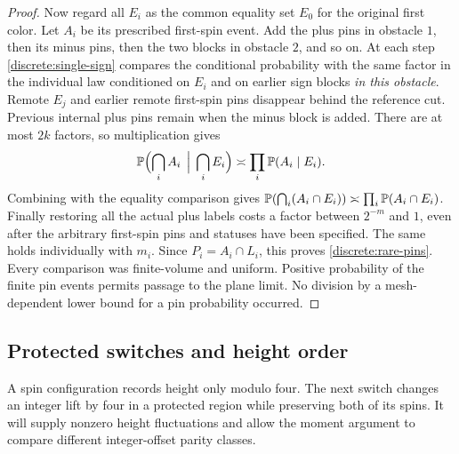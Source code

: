 \begin{proof}
Now regard all $E_i$ as the common equality set $E_0$ for the original
first color. Let $A_i$ be its prescribed first-spin event. Add the plus
pins in obstacle $1$, then its minus pins, then the two blocks in obstacle
$2$, and so on. At each step \eqref{discrete:single-sign} compares the
conditional probability with the same factor in the individual law
conditioned on $E_i$ and on earlier sign blocks \emph{in this obstacle}.
Remote $E_j$ and earlier remote first-spin pins disappear behind the
reference cut. Previous internal plus pins remain when the minus block
is added. There are at most $2k$ factors, so multiplication gives
\[
 \mathbb P\Bigl(\bigcap_i A_i\,\Bigm|\,\bigcap_i E_i\Bigr)
       \asymp\prod_i\mathbb P(A_i\mid E_i).
\]
Combining with the equality comparison gives
$\mathbb P(\bigcap_i(A_i\cap E_i))\asymp
\prod_i\mathbb P(A_i\cap E_i)$. Finally restoring all the actual plus
labels costs a factor between $2^{-m}$ and $1$, even after the arbitrary
first-spin pins and statuses have been specified. The same holds
individually with $m_i$. Since $P_i=A_i\cap L_i$, this proves
\eqref{discrete:rare-pins}. Every comparison was finite-volume and
uniform. Positive probability of the finite pin events permits passage
to the plane limit. No division by a mesh-dependent lower bound for a
pin probability occurred.
\end{proof}

\subsection{Protected switches and height order}

A spin configuration records height only modulo four.  The next switch
changes an integer lift by four in a protected region while preserving
both of its spins.  It will supply nonzero height fluctuations and allow
the moment argument to compare different integer-offset parity classes.

